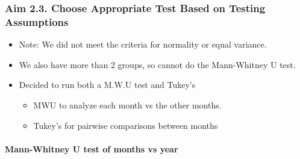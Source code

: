 \documentclass[11pt]{article}
\providecommand{\tightlist}{%
      \setlength{\itemsep}{0pt}\setlength{\parskip}{0pt}}
\begin{document}
    \hypertarget{aim-2.3.-choose-appropriate-test-based-on-testing-assumptions}{%
\subsubsection{Aim 2.3. Choose Appropriate Test Based on Testing
Assumptions}\label{aim-2.3.-choose-appropriate-test-based-on-testing-assumptions}}

\begin{itemize}
\tightlist
\item
  Note: We did not meet the criteria for normality or equal variance.
\item
  We also have more than 2 groups, so cannot do the Mann-Whitney U test.
\item
  Decided to run both a M.W.U test and Tukey's

  \begin{itemize}
  \tightlist
  \item
    MWU to analyze each month vs the other months.
  \item
    Tukey's for pairwise comparisons between months
  \end{itemize}
\end{itemize}

    \hypertarget{mann-whitney-u-test-of-months-vs-year}{%
\paragraph{Mann-Whitney U test of months vs
year}\label{mann-whitney-u-test-of-months-vs-year}}
\end{document}
